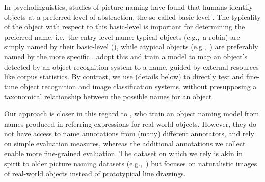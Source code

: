 %
In psycholinguistics, studies of picture naming have found that humans identify objects at a preferred level of abstraction, the so-called basic-level \cite{rosch1976basic,jolicoeur1984pictures}. 
The typicality of the object with respect to this basic-level is important for determining the preferred name, i.e.\ the entry-level name: typical objects (e.g.,\ a robin) are simply named by their basic-level \category (), while atypical objects (e.g.,\ ) are preferably named by the more specific \category.
\citet{Ordonez:2016} adopt this and train a model to map an object's \category detected by an object recognition system to a name, guided by external resources like corpus statistics.
By contrast, we use \mn (details below) to directly test and fine-tune object recognition and image classification systems, without presupposing a taxonomical relationship between the possible names for an object.

Our approach is closer in this regard to \citet{zarriess-schlangen:2017}, who train an object naming model from names produced in referring expressions for real-world objects.
However, they do not have access to name annotations from (many) different annotators, and rely on simple evaluation measures, whereas the additional annotations we collect enable more fine-grained evaluation.
The \mn dataset on which we rely is akin in spirit to older picture naming datasets (e.g.,~\citealt{rossion2004revisiting}) but focuses on naturalistic images of real-world objects instead of prototypical line drawings.

